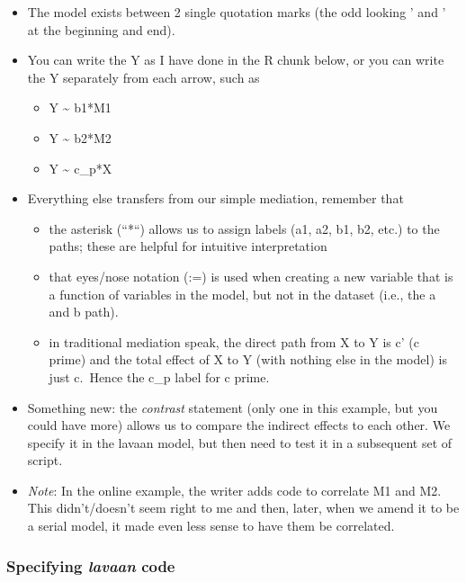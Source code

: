 \documentclass[
]{book}
\providecommand{\tightlist}{%
  \setlength{\itemsep}{0pt}\setlength{\parskip}{0pt}}
\begin{document}
\begin{itemize}
\item
  The model exists between 2 single quotation marks (the odd looking ' and ' at the beginning and end).
\item
  You can write the Y as I have done in the R chunk below, or you can write the Y separately from each arrow, such as

  \begin{itemize}
  \tightlist
  \item
    Y \textasciitilde{} b1*M1
  \item
    Y \textasciitilde{} b2*M2
  \item
    Y \textasciitilde{} c\_p*X
  \end{itemize}
\item
  Everything else transfers from our simple mediation, remember that

  \begin{itemize}
  \tightlist
  \item
    the asterisk (``*``) allows us to assign labels (a1, a2, b1, b2, etc.) to the paths; these are helpful for intuitive interpretation
  \item
    that eyes/nose notation (:=) is used when creating a new variable that is a function of variables in the model, but not in the dataset (i.e., the a and b path).
  \item
    in traditional mediation speak, the direct path from X to Y is c' (c prime) and the total effect of X to Y (with nothing else in the model) is just c.~Hence the c\_p label for c prime.
  \end{itemize}
\item
  Something new: the \emph{contrast} statement (only one in this example, but you could have more) allows us to compare the indirect effects to each other. We specify it in the lavaan model, but then need to test it in a subsequent set of script.
\item
  \emph{Note}: In the online example, the writer adds code to correlate M1 and M2. This didn't/doesn't seem right to me and then, later, when we amend it to be a serial model, it made even less sense to have them be correlated.
\end{itemize}

\hypertarget{specifying-lavaan-code}{%
\subsubsection{\texorpdfstring{Specifying \emph{lavaan} code}{Specifying lavaan code}}\label{specifying-lavaan-code}}
\end{document}
